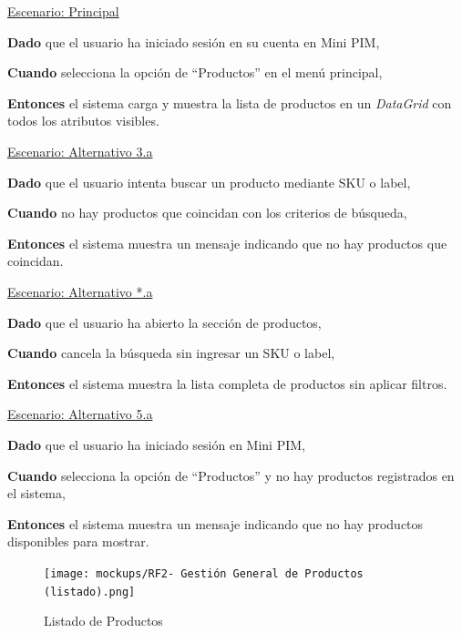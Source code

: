\underline{Escenario: Principal}\par
\vspace{0.15cm}
\textbf{Dado} que el usuario ha iniciado sesión en su cuenta en Mini PIM,\par
\textbf{Cuando} selecciona la opción de \enquote{Productos} en el menú principal,\par
\textbf{Entonces} el sistema carga y muestra la lista de productos en un \textit{DataGrid} con todos los atributos visibles.\par
\vspace{0.20cm}

\underline{Escenario: Alternativo 3.a}\par
\vspace{0.15cm}
\textbf{Dado} que el usuario intenta buscar un producto mediante SKU o label,\par
\textbf{Cuando} no hay productos que coincidan con los criterios de búsqueda,\par
\textbf{Entonces} el sistema muestra un mensaje indicando que no hay productos que coincidan.\par
\vspace{0.20cm}

\underline{Escenario: Alternativo *.a}\par
\vspace{0.15cm}
\textbf{Dado} que el usuario ha abierto la sección de productos,\par
\textbf{Cuando} cancela la búsqueda sin ingresar un SKU o label,\par
\textbf{Entonces} el sistema muestra la lista completa de productos sin aplicar filtros.\par
\vspace{0.20cm}

\underline{Escenario: Alternativo 5.a}\par
\vspace{0.15cm}
\textbf{Dado} que el usuario ha iniciado sesión en Mini PIM,\par
\textbf{Cuando} selecciona la opción de \enquote{Productos} y no hay productos registrados en el sistema,\par
\textbf{Entonces} el sistema muestra un mensaje indicando que no hay productos disponibles para mostrar.\par
\vspace{0.20cm}


\begin{figure}[H]
    \texttt{[image: mockups/RF2- Gestión General de Productos (listado).png]}
    \caption{Listado de Productos}
   \end{figure}
\vspace{1.0cm}

